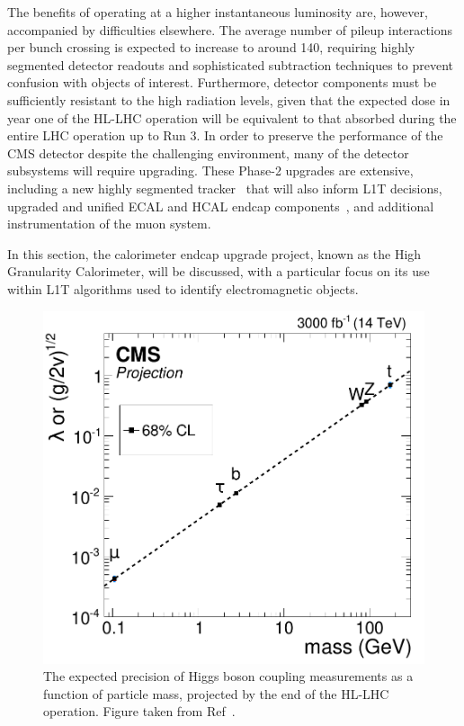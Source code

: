 The benefits of operating at a higher instantaneous luminosity are, however, accompanied by difficulties elsewhere. The average number of pileup interactions per bunch crossing is expected to increase to around 140, requiring highly segmented detector readouts and sophisticated subtraction techniques to prevent confusion with objects of interest. Furthermore, detector components must be sufficiently resistant to the high radiation levels, given that the expected dose in year one of the HL-LHC operation will be equivalent to that absorbed during the entire LHC operation up to Run 3. In order to preserve the performance of the CMS detector despite the challenging environment, many of the detector subsystems will require upgrading. These Phase-2 upgrades are extensive, including a new highly segmented tracker~\cite{CMS_phase2_tracker_upgrade} that will also inform L1T decisions, upgraded and unified ECAL and HCAL endcap components~\cite{CMS_phase2_HGCAL}, and additional instrumentation of the muon system. 

In this section, the calorimeter endcap upgrade project, known as the High Granularity Calorimeter, will be discussed, with a particular focus on its use within L1T algorithms used to identify electromagnetic objects.

\begin{figure}[htbp!]
\centering
\includegraphics[width =0.7\linewidth]{Figures/Detector/HGCAL/Misc/high_lumi_higgs_couplings.png}\hfill
\caption[The expected precision of Higgs boson coupling measurements at the HL-LHC.]{The expected precision of Higgs boson coupling measurements as a function of particle mass, projected by the end of the HL-LHC operation. Figure taken from Ref~\cite{CMS_phase2_TDR}.}
\label{fig:cms_high_lumi_couplings}
\end{figure}


